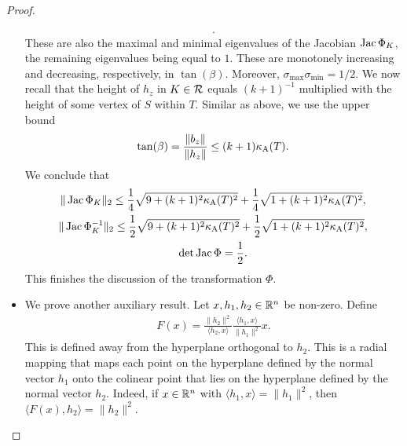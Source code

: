 \documentclass[10pt,a4paper]{article}
\begin{document}
\begin{proof}
\begin{itemize}
\begin{align*}
            .
        \end{align*}
        These are also the maximal and minimal eigenvalues of the Jacobian $\operatorname{{\rm Jac}} \Phi_{K}$, the remaining eigenvalues being equal to $1$. 
        These are monotonely increasing and decreasing, respectively, in $\tan(\beta)$. 
        Moreover, $\sigma_{\max} \sigma_{\min} = 1/2$. 
        We now recall that the height of $h_{z}$ in $K \in {\mathcal R}$ equals $(k+1)^{-1}$ multiplied with the height of some vertex of $S$ within $T$.
        Similar as above, we use the upper bound 
        \begin{align*}
            \tan(\beta) = \frac{\|  b_{z}  \|}{\|  h_{z}  \|} \leq (k+1) \kappa_{\rm A}(T).
        \end{align*}
        We conclude that 
        \begin{gather*}
            \|  \operatorname{{\rm Jac}}\Phi_{K}  \|_{2} 
            \leq 
            \frac 1 4 \sqrt{ 9 + (k+1)^2 \kappa_{\rm A}(T)^2 } + \frac 1 4 \sqrt{ 1 + (k+1)^2 \kappa_{\rm A}(T)^2 }
            ,
            \\
            \|  \operatorname{{\rm Jac}}\Phi_{K}^{-1}  \|_{2} 
            \leq 
            \frac 1 2 \sqrt{ 9 + (k+1)^2 \kappa_{\rm A}(T)^2 } + \frac 1 2 \sqrt{ 1 + (k+1)^2 \kappa_{\rm A}(T)^2 }
            ,
            \\
            \det \operatorname{{\rm Jac}}\Phi = \frac 1 2 
            .
        \end{gather*}
        This finishes the discussion of the transformation $\Phi$.






        

        
        
        \item 
        We prove another auxiliary result.
        Let $x, h_1, h_2 \in {\mathbb R}^{n}$ be non-zero. 
        Define 
        \begin{align*}
            F(x) 
            = 
            \frac{ \| h_2 \|^{2} }{ \langle h_2, x \rangle }
            \frac{ \langle h_1, x \rangle }{ \| h_1 \|^{2} }
            x
            .
        \end{align*}
        This is defined away from the hyperplane orthogonal to $h_2$.
        This is a radial mapping that maps each point on the hyperplane defined by the normal vector $h_1$
        onto the colinear point that lies on the hyperplane defined by the normal vector $h_2$. Indeed, 
        if $x \in {\mathbb R}^{n}$ with $\langle h_1, x \rangle = \| h_1 \|^{2}$, then $\langle F(x), h_2 \rangle = \| h_2 \|^{2}$.
        

\end{itemize}
\end{proof}
\end{document}
